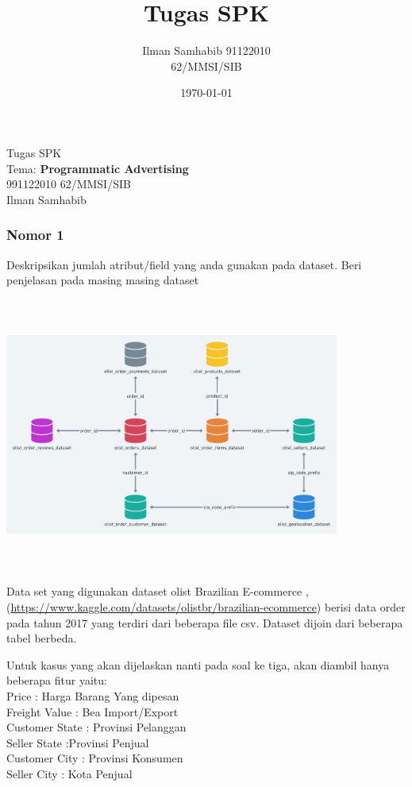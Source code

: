\documentclass{article}
\title{Tugas SPK}
\author{Ilman Samhabib 91122010\\62/MMSI/SIB}
\date{\today}
\begin{document}
\begin{center}
    Tugas SPK
    \\ Tema: \textbf{Programmatic Advertising} 
    \\ 991122010 62/MMSI/SIB
    \\ Ilman Samhabib
\end{center}

\subsubsection*{Nomor 1}
Deskripsikan jumlah atribut/field yang anda gunakan pada dataset. Beri penjelasan pada masing masing dataset
\bigbreak
\begin{center}
    \includegraphics[width=11cm, height=9cm]{images/olist.png}
\end{center}
Data set yang digunakan dataset olist Brazilian E-commerce \cite{Olist_2018}, 
(\url{https://www.kaggle.com/datasets/olistbr/brazilian-ecommerce})
berisi data order pada tahun 2017 yang terdiri dari beberapa file csv. Dataset dijoin dari beberapa tabel berbeda. 

Untuk kasus yang akan dijelaskan nanti pada soal ke tiga, akan diambil hanya beberapa fitur yaitu:
\\Price : Harga Barang Yang dipesan
\\Freight Value : Bea Import/Export 
\\Customer State : Provinsi Pelanggan
\\Seller State :Provinsi Penjual
\\Customer City : Provinsi Konsumen
\\Seller City : Kota Penjual
\end{document}
